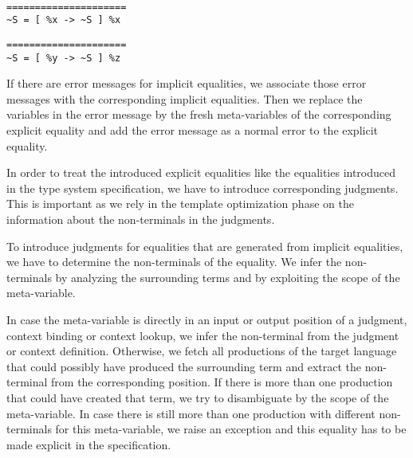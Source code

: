 \begin{example}{~}
\newline
  \begin{minipage}[b]{.45\linewidth}
    \begin{lstlisting}[language=sltc]
=====================
~S = [ %x -> ~S ] %x
\end{lstlisting}
  \end{minipage}
  \begin{minipage}[b]{.45\linewidth}
    \begin{lstlisting}[language=sltc]
%y = %z
=====================
~S = [ %y -> ~S ] %z
\end{lstlisting}
  \end{minipage}
\label{ex:implicit-equalities}
\end{example}

If there are error messages for implicit equalities, we associate
those error messages with the corresponding implicit equalities. Then
we replace the variables in the error message by the fresh
meta-variables of the corresponding explicit equality and add the
error message as a normal error to the explicit equality.

In order to treat the introduced explicit equalities like the
equalities introduced in the type system specification, we have to
introduce corresponding judgments. This is important as we rely in the
template optimization phase on the information about the non-terminals
in the judgments.

To introduce judgments for equalities that are generated from implicit
equalities, we have to determine the non-terminals of the
equality. We infer the non-terminals by analyzing the surrounding
terms and by exploiting the scope of the meta-variable.

In case the meta-variable is directly in an input or output position
of a judgment, context binding or context lookup, we infer the
non-terminal from the judgment or context definition. Otherwise, we
fetch all productions of the target language that could possibly have
produced the surrounding term and extract the non-terminal from the
corresponding position. If there is more than one production that
could have created that term, we try to disambiguate by the scope of
the meta-variable. In case there is still more than one production
with different non-terminals for this meta-variable, we raise an
exception and this equality has to be made explicit in the
specification.

